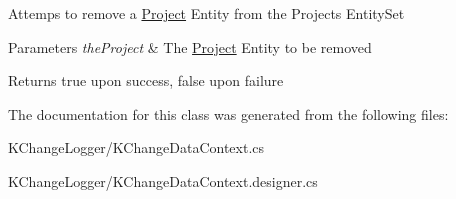 Attemps to remove a \hyperlink{class_k_change_logger_1_1_project}{Project} Entity from the Projects Entity\-Set 


\begin{DoxyParams}{Parameters}
{\em the\-Project} & The \hyperlink{class_k_change_logger_1_1_project}{Project} Entity to be removed\\
\hline
\end{DoxyParams}
\begin{DoxyReturn}{Returns}
true upon success, false upon failure
\end{DoxyReturn}


The documentation for this class was generated from the following files\-:\begin{DoxyCompactItemize}
\item 
K\-Change\-Logger/K\-Change\-Data\-Context.\-cs\item 
K\-Change\-Logger/K\-Change\-Data\-Context.\-designer.\-cs\end{DoxyCompactItemize}
